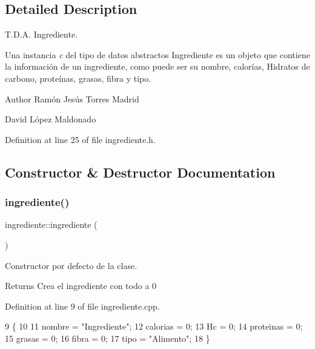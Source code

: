 \subsection{Detailed Description}
T.\+D.\+A. Ingrediente. 

Una instancia {\itshape c} del tipo de datos abstractos {\ttfamily Ingrediente} es un objeto que contiene la información de un ingrediente, como puede ser su nombre, calorías, Hidratos de carbono, proteínas, grasas, fibra y tipo.

\begin{DoxyAuthor}{Author}
Ramón Jesús Torres Madrid 

David López Maldonado 
\end{DoxyAuthor}


Definition at line 25 of file ingrediente.\+h.



\subsection{Constructor \& Destructor Documentation}
\mbox{\label{classingrediente_a4f2c8e16106eb4cf5a8ad9695d7a3809}} 
\subsubsection{\texorpdfstring{ingrediente()}{ingrediente()}\hspace{0.1cm}{\footnotesize\ttfamily [1/3]}}
{\footnotesize\ttfamily ingrediente\+::ingrediente (\begin{DoxyParamCaption}{ }\end{DoxyParamCaption})}



Constructor por defecto de la clase. 

\begin{DoxyReturn}{Returns}
Crea el ingrediente con todo a 0 
\end{DoxyReturn}


Definition at line 9 of file ingrediente.\+cpp.


\begin{DoxyCode}
9                         \{
10 
11     nombre = \textcolor{stringliteral}{"Ingrediente"};
12     calorias = 0;
13     Hc = 0;
14     proteinas = 0;
15     grasas = 0;
16     fibra = 0;
17     tipo = \textcolor{stringliteral}{"Alimento"};
18 \}
\end{DoxyCode}
\mbox{\label{classingrediente_af1786aa0950f0d9168ad051d4225622f}} 
